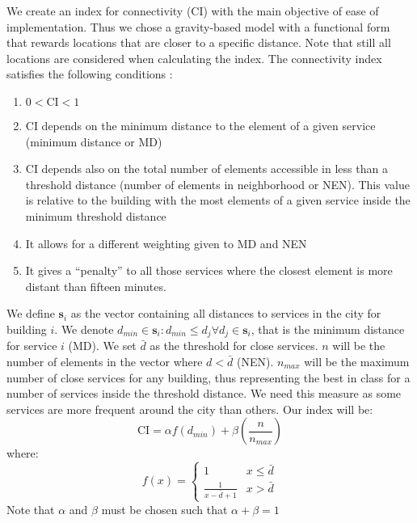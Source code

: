 \documentclass[12pt]{article}
\begin{document}
We create an index for connectivity (CI) with the main objective of ease of implementation. Thus we chose a gravity-based model with a functional form that rewards locations that are closer to a specific distance. Note that still all locations are considered when calculating the index. The connectivity index satisfies the following conditions :
	\begin{enumerate}
		\item $0<\text{CI}<1$
		\item CI depends on the minimum distance to the element of a given service (minimum distance or MD)
		\item CI depends also on the total number of elements accessible in less than a threshold distance (number of elements in neighborhood or NEN). This value is relative to the building with the most elements of a given service inside the minimum threshold distance
		\item It allows for a different weighting given to MD and NEN
		\item It gives a ``penalty'' to all those services where the closest element is more distant than fifteen minutes.
	\end{enumerate}
	We define $\boldsymbol{s}_i$ as the vector containing all distances to services in the city for building $i$. We denote $d_{min} \in \boldsymbol{s}_i: d_{min}\leq d_j \forall d_j \in  \boldsymbol{s}_i$, that is the minimum distance for service $i$ (MD). We set $\bar{d}$ as the threshold for close services. $n$ will be the number of elements in the vector where $d<\bar{d}$ (NEN). $n_{max}$ will be the maximum number of close services for any building, thus representing the best in class for a number of services inside the threshold distance. We need this measure as some services are more frequent around the city than others. Our index will be:
	\begin{equation}
		\text{CI}=\alpha f\left(d_{min}\right)+\beta \left(\frac{n}{n_{max}}\right)
	\end{equation}
	where:
	\begin{equation*}
		f(x)=
		\begin{cases} 
			1 & x\leq \bar{d} \\
			\frac{1}{x-\bar{d}+1} & x>\bar{d}
		\end{cases}
	\end{equation*}
 Note that $\alpha$ and $\beta$ must be chosen such that $\alpha+\beta=1$
 
\end{document}
